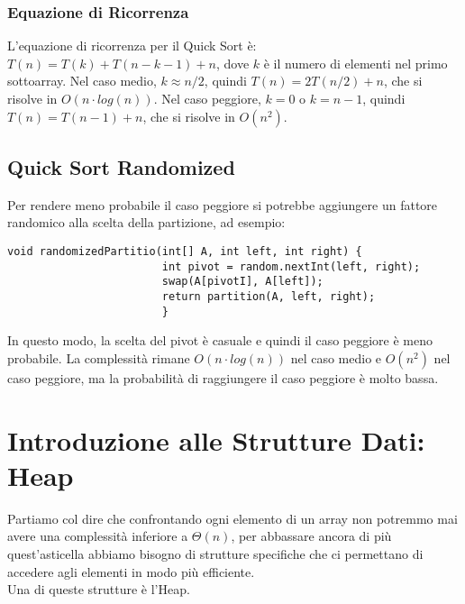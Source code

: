 \documentclass[a4paper,12pt]{article}
\begin{document}
                \subsubsection{Equazione di Ricorrenza}
                L'equazione di ricorrenza per il Quick Sort è: $T(n) = T(k) + T(n-k-1) + n$, dove $k$ è il numero di elementi nel primo sottoarray. Nel caso medio, $k \approx n/2$, quindi $T(n) = 2T(n/2) + n$, che si risolve in $O(n \cdot log(n))$. Nel caso peggiore, $k = 0$ o $k = n-1$, quindi $T(n) = T(n-1) + n$, che si risolve in $O(n^2)$.
                
                \subsection{Quick Sort Randomized}
                Per rendere meno probabile il caso peggiore si potrebbe aggiungere un fattore randomico alla scelta della partizione, ad esempio:
                \begin{lstlisting}[style=mystyle]
                    void randomizedPartitio(int[] A, int left, int right) {
                        int pivot = random.nextInt(left, right);
                        swap(A[pivotI], A[left]);
                        return partition(A, left, right);
                        }
                    \end{lstlisting}
                    In questo modo, la scelta del pivot è casuale e quindi il caso peggiore è meno probabile. La complessità rimane $O(n \cdot log(n))$ nel caso medio e $O(n^2)$ nel caso peggiore, ma la probabilità di raggiungere il caso peggiore è molto bassa.
                    
                    \section{Introduzione alle Strutture Dati: Heap}
                    Partiamo col dire che confrontando ogni elemento di un array non potremmo mai avere una complessità inferiore a $\Theta(n)$, per abbassare ancora di più quest'asticella abbiamo bisogno di strutture specifiche che ci permettano di accedere agli elementi in modo più efficiente. \\
                    Una di queste strutture è l'Heap.
\end{document}
